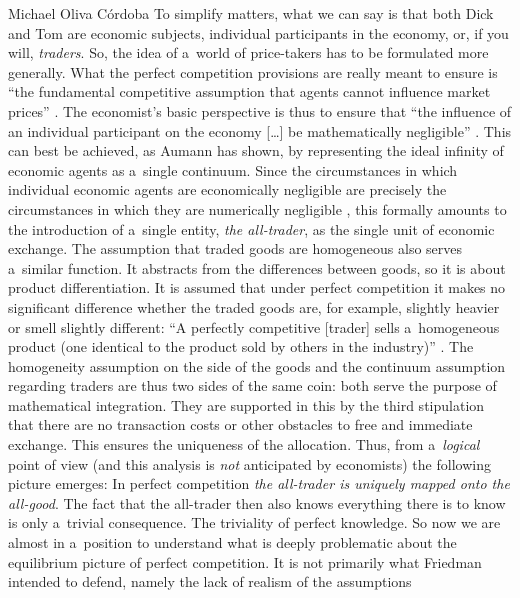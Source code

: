 \begin{artengenv}{Michael Oliva Córdoba}
To simplify matters, what we can say is that both Dick and Tom are economic subjects, individual participants in the economy, or, if you will, \textit{traders}. So, the idea of a~world of price-takers has to be formulated more generally. What the perfect competition provisions are really meant to ensure is ``the fundamental competitive assumption that agents cannot influence market prices'' 
\parencites[][p.225]{safra_strategic_1989}[cf.][]{palgrave_macmillan_perfect_2008}. %
 The economist's basic perspective is thus to ensure that ``the influence of an individual participant on the economy […] be mathematically negligible'' 
\parencite[][p.39]{aumann_markets_1964}. %
 This can best be achieved, as Aumann has shown, by representing the ideal infinity of economic agents as a~single continuum. Since the circumstances in which individual economic agents are economically negligible are precisely the circumstances in which they are numerically negligible 
\parencite[][p.332]{bryant_general_2010}, %
 this formally amounts to the introduction of a~single entity, \textit{the all-trader}, as the single unit of economic exchange. The assumption that traded goods are homogeneous also serves a~similar function. It abstracts from the differences between goods, so it is about product differentiation. It is assumed that under perfect competition it makes no significant difference whether the traded goods are, for example, slightly heavier or smell slightly different: ``A perfectly competitive [trader] sells a~homogeneous product (one identical to the product sold by others in the industry)'' 
\parencite[][p.150]{samuelson_economics_2009}. %
 The homogeneity assumption on the side of the goods and the continuum assumption regarding traders are thus two sides of the same coin: both serve the purpose of mathematical integration. They are supported in this by the third stipulation that there are no transaction costs or other obstacles to free and immediate exchange. This ensures the uniqueness of the allocation. Thus, from a~\textit{logical} point of view (and this analysis is \textit{not} anticipated by economists) the following picture emerges: In perfect competition \textit{the all-trader is uniquely mapped onto the all-good}. The fact that the all-trader then also knows everything there is to know is only a~trivial consequence. The triviality of perfect knowledge. So now we are almost in a~position to understand what is deeply problematic about the equilibrium picture of perfect competition. It is not primarily what Friedman intended to defend, namely the lack of realism of the assumptions 

\end{artengenv}
